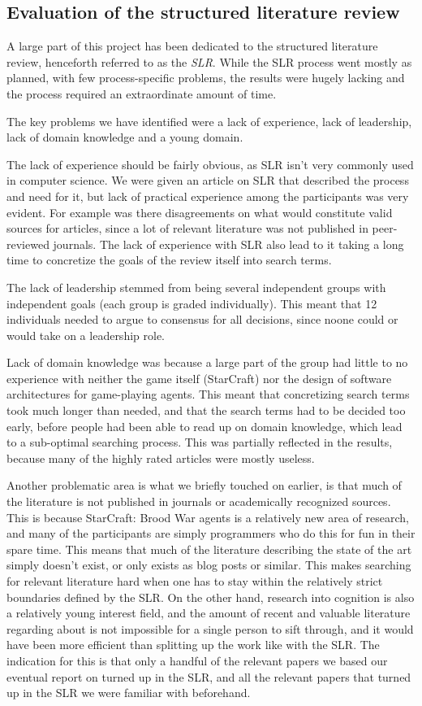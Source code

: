 \subsection{Evaluation of the structured literature review}
A large part of this project has been dedicated to the structured literature
review, henceforth referred to as the \textit{SLR}. While the SLR process went
mostly as planned, with few process-specific problems, the results were hugely
lacking and the process required an extraordinate amount of time.

The key problems we have identified were a lack of experience, lack of
leadership, lack of domain knowledge and a young domain.

The lack of experience should be fairly obvious, as SLR isn't very commonly
used in computer science. We were given an article on SLR that described the
process and need for it, but lack of practical experience among the
participants was very evident. For example was there disagreements on what
would constitute valid sources for articles, since a lot of relevant literature
was not published in peer-reviewed journals. The lack of
experience with SLR also lead to it taking a long time to concretize the goals
of the review itself into search terms.

The lack of leadership stemmed from being several independent groups with
independent goals (each group is graded individually). This meant that 12
individuals needed to argue to consensus for all decisions, since noone could
or would take on a leadership role.

Lack of domain knowledge was because a large part of the group had little to no
experience with neither the game itself (StarCraft) nor the design of software
architectures for game-playing agents. This meant that concretizing search
terms took much longer than needed, and that the search terms had to be decided
too early, before people had been able to read up on domain knowledge, which
lead to a sub-optimal searching process. This was partially reflected in the
results, because many of the highly rated articles were mostly useless.

Another problematic area is what we briefly touched on earlier, is that much of
the literature is not published in journals or academically recognized sources.
This is because StarCraft: Brood War agents is a relatively new area of
research, and many of the participants are simply programmers who do this for
fun in their spare time. This means that much of the literature describing the
state of the art simply doesn't exist, or only exists as blog posts or similar.
This makes searching for relevant literature hard when one has to stay within
the relatively strict boundaries defined by the SLR. On the other hand,
research into cognition is also a relatively young interest field, and the
amount of recent and valuable literature regarding about is not impossible for a
single person to sift through, and it would have been more efficient than
splitting up the work like with the SLR. The indication for this is that only a
handful of the relevant papers we based our eventual report on turned up in the
SLR, and all the relevant papers that turned up in the SLR we were familiar
with beforehand.


